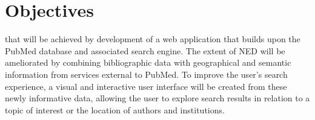 \documentclass[PROP_AGutteridge_CS.tex]{subfiles}
\begin{document}
\chapter{Objectives}

 that will be achieved by development of a web application that builds upon the PubMed database and associated search engine.
The extent of NED will be ameliorated by combining bibliographic data with geographical and semantic information from services external to PubMed. To improve the user's search experience, a visual and interactive user interface will be created from these newly informative data, allowing the user to explore search results in relation to a topic of interest or the location of authors and institutions. 
 
\end{document}
